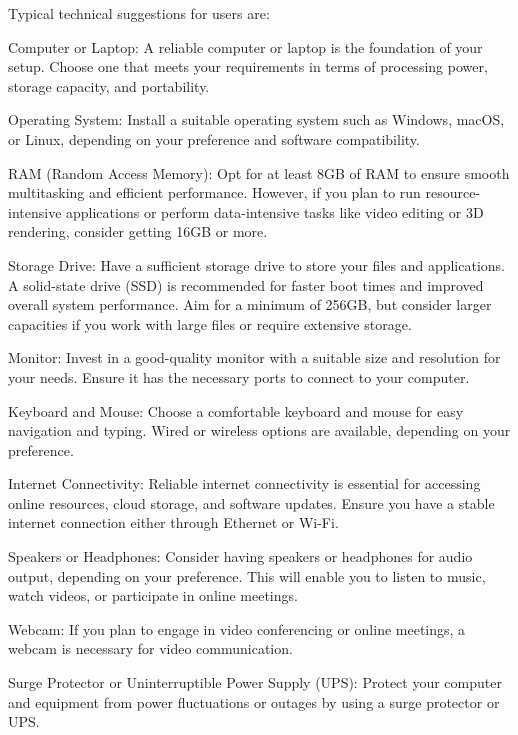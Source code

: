 
Typical technical suggestions for users are:
\begin{outline}

	\1 Computer or Laptop: A reliable computer or laptop is the foundation of your setup. 
	Choose one that meets your requirements in terms of processing power, storage capacity, and portability.

	\1  Operating System: Install a suitable operating system such as Windows, macOS, or Linux, depending on your preference and software compatibility.

	\1  RAM (Random Access Memory): Opt for at least 8GB of RAM to ensure smooth multitasking and efficient performance. However, if you plan to run resource-intensive applications or perform data-intensive tasks like video editing or 3D rendering, consider getting 16GB or more.

	\1  Storage Drive: Have a sufficient storage drive to store your files and applications. A solid-state drive (SSD) is recommended for faster boot times and improved overall system performance. Aim for a minimum of 256GB, but consider larger capacities if you work with large files or require extensive storage.

	\1  Monitor: Invest in a good-quality monitor with a suitable size and resolution for your needs. Ensure it has the necessary ports to connect to your computer.

	\1  Keyboard and Mouse: Choose a comfortable keyboard and mouse for easy navigation and typing. Wired or wireless options are available, depending on your preference.

	\1  Internet Connectivity: Reliable internet connectivity is essential for accessing online resources, cloud storage, and software updates. Ensure you have a stable internet connection either through Ethernet or Wi-Fi.

	\1  Speakers or Headphones: Consider having speakers or headphones for audio output, depending on your preference. This will enable you to listen to music, watch videos, or participate in online meetings.

	\1  Webcam: If you plan to engage in video conferencing or online meetings, a webcam is necessary for video communication.

	\1  Surge Protector or Uninterruptible Power Supply (UPS): Protect your computer and equipment from power fluctuations or outages by using a surge protector or UPS.	 
\end{outline}
  
  
  
 
